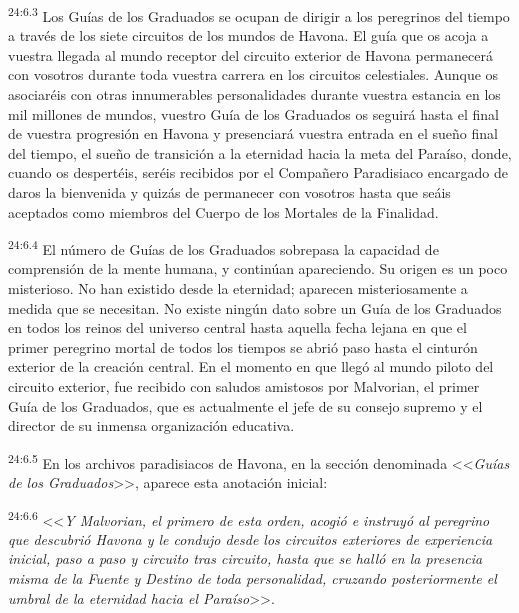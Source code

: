 \par
\textsuperscript{24:6.3} Los Guías de los Graduados se ocupan de dirigir a los peregrinos del tiempo a través de los siete circuitos de los mundos de Havona. El guía que os acoja a vuestra llegada al mundo receptor del circuito exterior de Havona permanecerá con vosotros durante toda vuestra carrera en los circuitos celestiales. Aunque os asociaréis con otras innumerables personalidades durante vuestra estancia en los mil millones de mundos, vuestro Guía de los Graduados os seguirá hasta el final de vuestra progresión en Havona y presenciará vuestra entrada en el sueño final del tiempo, el sueño de transición a la eternidad hacia la meta del Paraíso, donde, cuando os despertéis, seréis recibidos por el Compañero Paradisiaco encargado de daros la bienvenida y quizás de permanecer con vosotros hasta que seáis aceptados como miembros del Cuerpo de los Mortales de la Finalidad.

\par
\textsuperscript{24:6.4} El número de Guías de los Graduados sobrepasa la capacidad de comprensión de la mente humana, y continúan apareciendo. Su origen es un poco misterioso. No han existido desde la eternidad; aparecen misteriosamente a medida que se necesitan. No existe ningún dato sobre un Guía de los Graduados en todos los reinos del universo central hasta aquella fecha lejana en que el primer peregrino mortal de todos los tiempos se abrió paso hasta el cinturón exterior de la creación central. En el momento en que llegó al mundo piloto del circuito exterior, fue recibido con saludos amistosos por Malvorian, el primer Guía de los Graduados, que es actualmente el jefe de su consejo supremo y el director de su inmensa organización educativa.

\par
\textsuperscript{24:6.5} En los archivos paradisiacos de Havona, en la sección denominada <<\textit{Guías de los Graduados}>>, aparece esta anotación inicial:

\par
\textsuperscript{24:6.6} <<\textit{Y Malvorian, el primero de esta orden, acogió e instruyó al peregrino que descubrió Havona y le condujo desde los circuitos exteriores de experiencia inicial, paso a paso y circuito tras circuito, hasta que se halló en la presencia misma de la Fuente y Destino de toda personalidad, cruzando posteriormente el umbral de la eternidad hacia el Paraíso}>>.


